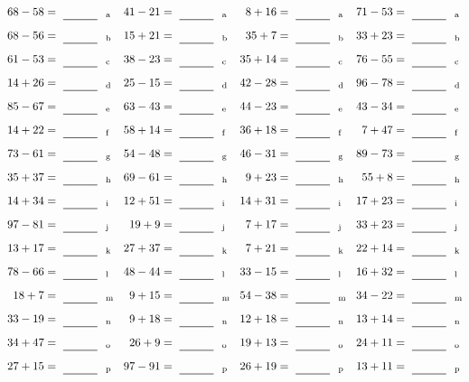 \documentclass
[
  draft    = true,
  fontsize = 11pt,
  parskip  = half-
]
{scrartcl}
\begin{document}
\clearpage
\begin{align*}
    \pline{68-58}&=\rline{a}
  & \pline{41-21}&=\rline{a}
  & \pline{8+16}&=\rline{a}
  & \pline{71-53}&=\rline{a} \\[1ex]
    \pline{68-56}&=\rline{b}
  & \pline{15+21}&=\rline{b}
  & \pline{35+7}&=\rline{b}
  & \pline{33+23}&=\rline{b} \\[1ex]
    \pline{61-53}&=\rline{c}
  & \pline{38-23}&=\rline{c}
  & \pline{35+14}&=\rline{c}
  & \pline{76-55}&=\rline{c} \\[1ex]
    \pline{14+26}&=\rline{d}
  & \pline{25-15}&=\rline{d}
  & \pline{42-28}&=\rline{d}
  & \pline{96-78}&=\rline{d} \\[1ex]
    \pline{85-67}&=\rline{e}
  & \pline{63-43}&=\rline{e}
  & \pline{44-23}&=\rline{e}
  & \pline{43-34}&=\rline{e} \\[1ex]
    \pline{14+22}&=\rline{f}
  & \pline{58+14}&=\rline{f}
  & \pline{36+18}&=\rline{f}
  & \pline{7+47}&=\rline{f} \\[1ex]
    \pline{73-61}&=\rline{g}
  & \pline{54-48}&=\rline{g}
  & \pline{46-31}&=\rline{g}
  & \pline{89-73}&=\rline{g} \\[1ex]
    \pline{35+37}&=\rline{h}
  & \pline{69-61}&=\rline{h}
  & \pline{9+23}&=\rline{h}
  & \pline{55+8}&=\rline{h} \\[1ex]
    \pline{14+34}&=\rline{i}
  & \pline{12+51}&=\rline{i}
  & \pline{14+31}&=\rline{i}
  & \pline{17+23}&=\rline{i} \\[1ex]
    \pline{97-81}&=\rline{j}
  & \pline{19+9}&=\rline{j}
  & \pline{7+17}&=\rline{j}
  & \pline{33+23}&=\rline{j} \\[1ex]
    \pline{13+17}&=\rline{k}
  & \pline{27+37}&=\rline{k}
  & \pline{7+21}&=\rline{k}
  & \pline{22+14}&=\rline{k} \\[1ex]
    \pline{78-66}&=\rline{l}
  & \pline{48-44}&=\rline{l}
  & \pline{33-15}&=\rline{l}
  & \pline{16+32}&=\rline{l} \\[1ex]
    \pline{18+7}&=\rline{m}
  & \pline{9+15}&=\rline{m}
  & \pline{54-38}&=\rline{m}
  & \pline{34-22}&=\rline{m} \\[1ex]
    \pline{33-19}&=\rline{n}
  & \pline{9+18}&=\rline{n}
  & \pline{12+18}&=\rline{n}
  & \pline{13+14}&=\rline{n} \\[1ex]
    \pline{34+47}&=\rline{o}
  & \pline{26+9}&=\rline{o}
  & \pline{19+13}&=\rline{o}
  & \pline{24+11}&=\rline{o} \\[1ex]
    \pline{27+15}&=\rline{p}
  & \pline{97-91}&=\rline{p}
  & \pline{26+19}&=\rline{p}
  & \pline{13+11}&=\rline{p}
\end{align*}
\end{document}
